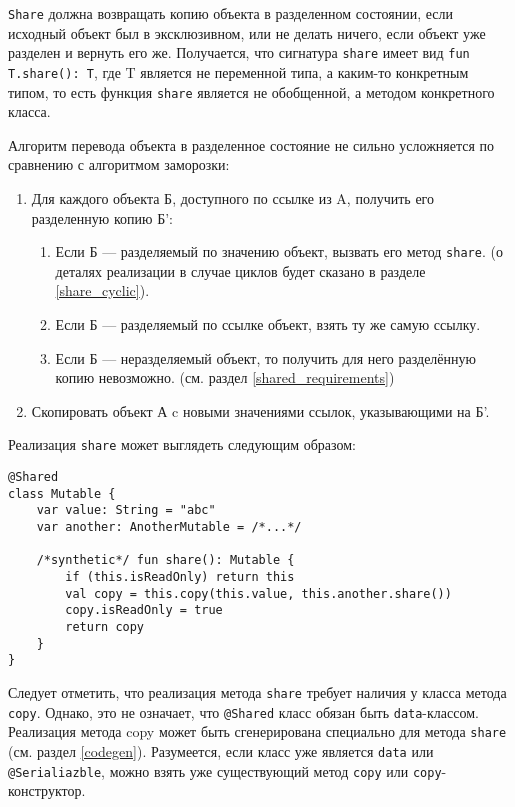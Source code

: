 \documentclass[specification,annotation,times]{itmo-student-thesis}
\begin{document}
\texttt{Share} должна возвращать копию объекта в разделенном состоянии, если исходный объект был в эксклюзивном, или не делать ничего, если объект уже разделен и вернуть его же.
Получается, что сигнатура \texttt{share} имеет вид \texttt{fun T.share(): T}, где T является не переменной типа, а каким-то конкретным типом, то есть функция \texttt{share} является не обобщенной, а методом конкретного класса.

Алгоритм перевода объекта в разделенное состояние не сильно усложняется по сравнению с алгоритмом заморозки:

\begin{enumerate}
	\item Для каждого объекта Б, доступного по ссылке из A, получить его разделенную копию Б':
	\begin{enumerate}
		\item Если Б --- разделяемый по значению объект, вызвать его метод \texttt{share}. (о деталях реализации в случае циклов будет сказано в разделе \ref{share_cyclic}).
		\item Если Б --- разделяемый по ссылке объект, взять ту же самую ссылку.
		\item Если Б --- неразделяемый объект, то получить для него разделённую копию невозможно. (см. раздел \ref{shared_requirements})
	\end{enumerate}
	\item Скопировать объект А c новыми значениями ссылок, указывающими на Б'.
\end{enumerate}

Реализация \texttt{share} может выглядеть следующим образом:

\begin{lstlisting}[float=h!,caption={Реализация share}]
@Shared
class Mutable {
	var value: String = "abc"
	var another: AnotherMutable = /*...*/
	
	/*synthetic*/ fun share(): Mutable {
		if (this.isReadOnly) return this
		val copy = this.copy(this.value, this.another.share())
		copy.isReadOnly = true
		return copy
	}
}
\end{lstlisting}

Следует отметить, что реализация метода \texttt{share} требует наличия у класса метода \texttt{copy}.
Однако, это не означает, что \texttt{@Shared} класс обязан быть \texttt{data}-классом.
Реализация метода copy может быть сгенерирована специально для метода \texttt{share} (см. раздел \ref{codegen}).
Разумеется, если класс уже является \texttt{data} или \texttt{@Serialiazble}, можно взять уже существующий метод \texttt{copy} или \texttt{copy}-конструктор.
\end{document}
